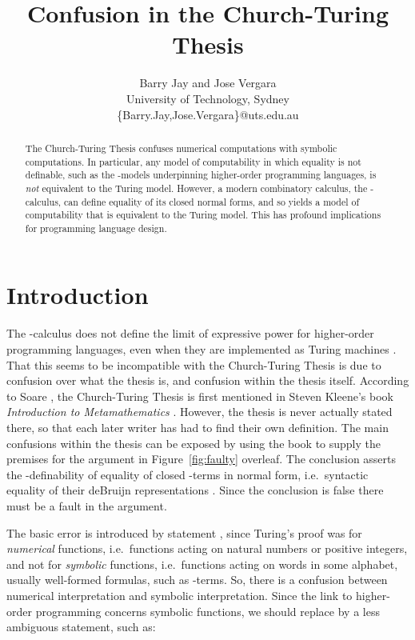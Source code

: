 \documentclass[a4paper]{article}
\title{Confusion in the Church-Turing Thesis }
\author{Barry Jay and Jose Vergara \\
 University of Technology, Sydney \\
\{Barry.Jay,Jose.Vergara\}@uts.edu.au}
\begin{document}
\maketitle
\makeatactive

\begin{abstract}

  The Church-Turing Thesis confuses numerical computations with
  symbolic computations. In particular, any model of computability in
  which equality is not definable, such as the -models
  underpinning higher-order programming languages, is {\em not}
  equivalent to the Turing model. However, a modern combinatory
  calculus, the -calculus, can define equality of its closed
  normal forms, and so yields a model of computability that is
  equivalent to the Turing model. This has profound implications for
  programming language design.
\end{abstract}



\section{Introduction}
\label{sec:intro}



The -calculus \cite{Church41,Bare84a} does not define the limit of
expressive power for higher-order programming languages, even when
they are implemented as Turing machines \cite{Turing36}. That this
seems to be incompatible with the Church-Turing Thesis is due to
confusion over what the thesis is, and confusion within the thesis
itself.  According to Soare \cite[page 11]{soare1999history}, the
Church-Turing Thesis is first mentioned in Steven Kleene's book {\em
  Introduction to Metamathematics} \cite{Kleene52}. However, the
thesis is never actually stated there, so that each later writer has
had to find their own definition. The main confusions within the
thesis can be exposed by using the book to supply the premises for the
argument in Figure~\ref{fig:faulty} overleaf. The conclusion asserts
the -definability of equality of closed -terms in normal form,
i.e.\ syntactic equality of their deBruijn representations
\cite{deBruijn}.  Since the conclusion is false \cite[page
519]{Bare84a} there must be a fault in the argument. 

The basic error is introduced by statement , since Turing's proof
was for {\em numerical} functions, i.e.\ functions acting on natural
numbers or positive integers, and not for {\em symbolic} functions,
i.e.\ functions acting on words in some alphabet, usually well-formed
formulas, such as -terms.  So, there is a confusion between
numerical interpretation and symbolic interpretation. Since the link
to higher-order programming concerns symbolic functions, we should
replace  by a less ambiguous statement, such as:
\end{document}
